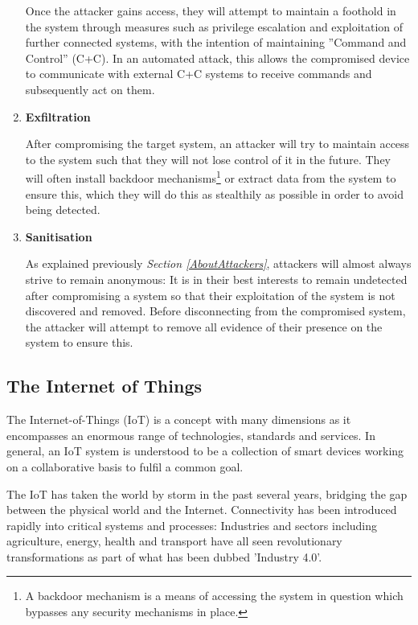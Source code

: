 \begin{enumerate}
Once the attacker gains access, they will attempt to maintain a foothold in the system through measures such as privilege escalation and exploitation of further connected systems, with the intention of maintaining ''Command and Control'' (C+C). In an automated attack, this allows the compromised device to communicate with external C+C systems to receive commands and subsequently act on them.


\item \textbf{Exfiltration}

After compromising the target system, an attacker will try to maintain access to the system such that they will not lose control of it in the future. They will often install backdoor mechanisms\footnote{A backdoor mechanism is a means of accessing the system in question which bypasses any security mechanisms in place.} or extract data from the system to ensure this, which they will do this as stealthily as possible in order to avoid being detected.

\item \textbf{Sanitisation} 

As explained previously \textit{Section \ref{AboutAttackers}}, attackers will almost always strive to remain anonymous: It is in their best interests to remain undetected after compromising a system so that their exploitation of the system is not discovered and removed. Before disconnecting from the compromised system, the attacker will attempt to remove all evidence of their presence on the system to ensure this.
\end{enumerate}

\subsection{The Internet of Things}
	
The Internet-of-Things (IoT) is a concept with many dimensions as it encompasses an enormous range of technologies, standards and services. In general, an IoT system is understood to be a collection of smart devices working on a collaborative basis to fulfil a common goal. \cite{journals/cn/SicariRGC15} 

The IoT has taken the world by storm in the past several years, bridging the gap between the physical world and the Internet. Connectivity has been introduced rapidly into critical systems and processes: Industries and sectors including agriculture, energy, health and transport have all seen revolutionary transformations as part of what has been dubbed 'Industry 4.0'. 

